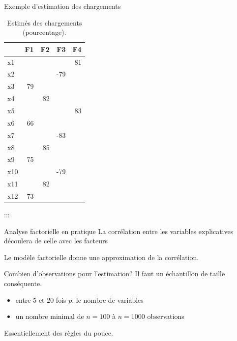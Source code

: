 \documentclass[
  ignorenonframetext,
]{beamer}
\providecommand{\tightlist}{%
  \setlength{\itemsep}{0pt}\setlength{\parskip}{0pt}}\usepackage{longtable,booktabs,array}
\begin{document}
\begin{frame}{Exemple d'estimation des chargements}
\protect\hypertarget{exemple-destimation-des-chargements}{}
\hypertarget{tbl-factocp}{}
\begin{table}
\caption{\label{tbl-factocp}Estimés des chargements (pourcentage). }\tabularnewline

\centering
\begin{tabular}{lrrrr}
\toprule
  & F1 & F2 & F3 & F4\\
\midrule
x1 &  &  &  & 81\\
x2 &  &  & -79 & \\
x3 & 79 &  &  & \\
x4 &  & 82 &  & \\
x5 &  &  &  & 83\\
\addlinespace
x6 & 66 &  &  & \\
x7 &  &  & -83 & \\
x8 &  & 85 &  & \\
x9 & 75 &  &  & \\
x10 &  &  & -79 & \\
\addlinespace
x11 &  & 82 &  & \\
x12 & 73 &  &  & \\
\bottomrule
\end{tabular}
\end{table}

:::
\end{frame}

\begin{frame}{Analyse factorielle en pratique}
\protect\hypertarget{analyse-factorielle-en-pratique}{}
La corrélation entre les variables explicatives découlera de celle avec
les facteurs

Le modèle factorielle donne une approximation de la corrélation.
\end{frame}

\begin{frame}{Combien d'observations pour l'estimation?}
\protect\hypertarget{combien-dobservations-pour-lestimation}{}
Il faut un échantillon de taille conséquente.

\begin{itemize}
\tightlist
\item
  entre 5 et 20 fois \(p\), le nombre de variables
\item
  un nombre minimal de \(n=100\) à \(n=1000\) observations
\end{itemize}

Essentiellement des règles du pouce.
\end{frame}
\end{document}
